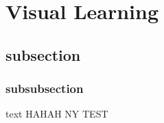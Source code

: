 \section{Visual Learning}
\subsection{subsection}
\subsubsection{subsubsection}
text HAHAH NY TEST 
